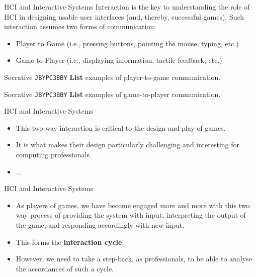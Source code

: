 \begin{frame}{HCI and Interactive Systems}
	Interaction is the key to understanding the role of HCI in designing usable user interfaces (and, thereby, successful games). 
	Such interaction assumes two forms of communication:
	
	\begin{itemize}
		\item Player to Game (i.e., pressing buttons, pointing the mouse, typing, etc.)
		\item Game to Player (i.e., displaying information, tactile feedback, etc.)
	\end{itemize}
\end{frame}

\begin{frame}[fragile]{Socrative \texttt{JBYPC3BBY}}
    \textbf{List} examples of player-to-game communication.
\end{frame}

\begin{frame}[fragile]{Socrative \texttt{JBYPC3BBY}}
    \textbf{List} examples of game-to-player communication.
\end{frame}

\begin{frame}{HCI and Interactive Systems}
	\begin{itemize}
		\item This two-way interaction is critical to the design and play of games.
		\item  It is what makes their design particularly challenging and interesting for computing professionals. 
		\item ...
	\end{itemize}
\end{frame}

\begin{frame}{HCI and Interactive Systems}
	\begin{itemize}
		\item As players of games, we have become engaged more and more with this two way process of providing
		the system with input, interpreting the output of the game, and responding accordingly with new input.
		\item This forms the \textbf{interaction cycle}.
		\item However, we need to take a step-back, as professionals, to be able to analyse the accordances of such a cycle.
	\end{itemize}
\end{frame}

